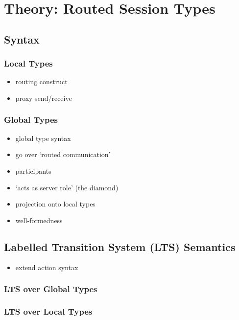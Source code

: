 \chapter{Theory: Routed Session Types}
\label{chap:theory}

\section{Syntax}

\subsection{Local Types}

\begin{itemize}
\item routing construct
\item proxy send/receive
\end{itemize}

\subsection{Global Types}

\begin{itemize}
\item global type syntax
\item go over `routed communication'
\item participants
\item `acts as server role' (the diamond)
\item projection onto local types
\item well-formedness
\end{itemize}

\section{Labelled Transition System (LTS) Semantics}

\begin{itemize}
\item extend action syntax
\end{itemize}

\subsection{LTS over Global Types}

\subsection{LTS over Local Types}


